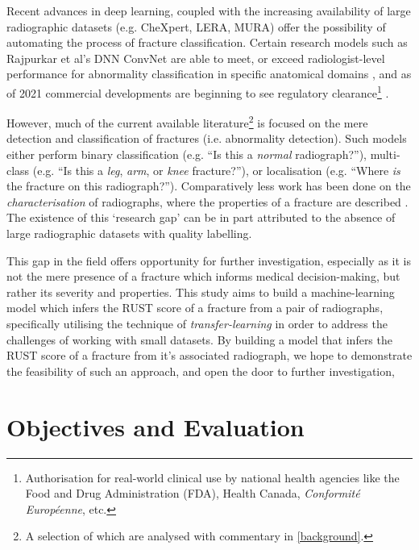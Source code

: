 Recent advances in deep learning, coupled with the increasing availability of large radiographic datasets (e.g. CheXpert, LERA, MURA) \autocites{CheXpert2019}{LERA}{MURA2017} offer the possibility of automating the process of fracture classification. Certain research models such as Rajpurkar et al's DNN ConvNet are able to meet, or exceed radiologist-level performance for abnormality classification in specific anatomical domains \autocite{MURA2017}, and as of 2021 commercial developments are beginning to see regulatory clearance\footnote{Authorisation for real-world clinical use by national health agencies like the Food and Drug Administration (FDA), Health Canada, \emph{Conformité Européenne}, etc.} \autocite{Adams2021}.

However, much of the current available literature\footnote{A selection of which are analysed with commentary in \autoref{background}.} is focused on the mere detection and classification of fractures (i.e. abnormality detection). Such models either perform binary classification (e.g. \enquote{Is this a \emph{normal} radiograph?}), multi-class (e.g. \enquote{Is this a \emph{leg}, \emph{arm}, or \emph{knee} fracture?}), or localisation (e.g. \enquote{Where \emph{is} the fracture on this radiograph?}). Comparatively less work has been done on the \emph{characterisation} of radiographs, where the properties of a fracture are described \autocite{Tanzi2020}. The existence of this \enquote*{research gap} can be in part attributed to the absence of large radiographic datasets with quality labelling.

This gap in the field offers opportunity for further investigation, especially as it is not the mere presence of a fracture which informs medical decision-making, but rather its severity and properties. This study aims to build a machine-learning model which infers the RUST score of a fracture from a pair of radiographs, specifically utilising the technique of \emph{transfer-learning} in order to address the challenges of working with small datasets. By building a model that infers the RUST score of a fracture from it's associated radiograph, we hope to demonstrate the feasibility of such an approach, and open the door to further investigation, 

\section{Objectives and Evaluation}



